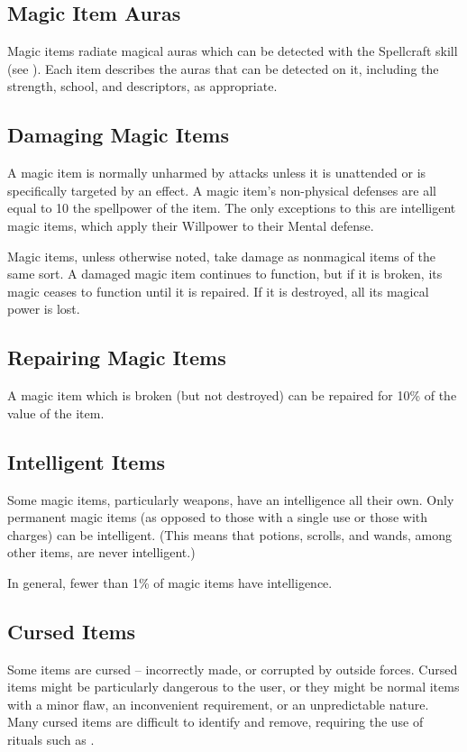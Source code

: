    \subsection{Magic Item Auras}

        Magic items radiate magical auras which can be detected with the Spellcraft skill (see ).
        Each item describes the auras that can be detected on it, including the strength, school, and descriptors, as appropriate.

    \subsection{Damaging Magic Items}

        A magic item is normally unharmed by attacks unless it is unattended or is specifically targeted by an effect.
        A magic item's non-physical defenses are all equal to 10 \add the spellpower of the item.
        The only exceptions to this are intelligent magic items, which apply their Willpower to their Mental defense.

        Magic items, unless otherwise noted, take damage as nonmagical items of the same sort.
        A damaged magic item continues to function, but if it is broken, its magic ceases to function until it is repaired.
        If it is destroyed, all its magical power is lost.

    \subsection{Repairing Magic Items}

        A magic item which is broken (but not destroyed) can be repaired for 10\% of the value of the item.

    \subsection{Intelligent Items}

        Some magic items, particularly weapons, have an intelligence all their own.
        Only permanent magic items (as opposed to those with a single use or those with charges) can be intelligent.
        (This means that potions, scrolls, and wands, among other items, are never intelligent.)

        In general, fewer than 1\% of magic items have intelligence.

    \subsection{Cursed Items}

        Some items are cursed -- incorrectly made, or corrupted by outside forces.
        Cursed items might be particularly dangerous to the user, or they might be normal items with a minor flaw, an inconvenient requirement, or an unpredictable nature.
        Many cursed items are difficult to identify and remove, requiring the use of rituals such as .
